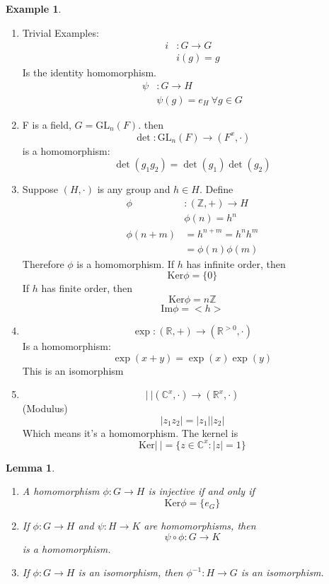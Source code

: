 \documentclass{report}
\newtheorem{lemma}[theorem]{Lemma}
\theoremstyle{remark}
\theoremstyle{definition}
\theoremstyle{definition}
\newtheorem{example}[theorem]{Example}
\theoremstyle{theorem}
\begin{document}
\begin{example}
\begin{enumerate}[label=\textcircled{\tiny{\arabic*}}]
    \setcounter{enumi}{0}
    \item Trivial Examples:
    \begin{align*}
        i&: G \rightarrow G\\
        &i(g)=g 
    \end{align*}
    Is the identity homomorphism.
    \begin{align*}
        \psi&:G \rightarrow H\\
        &\psi(g)=e_H \> \forall g \in G
    \end{align*}
    \item F is a field, $G=\mathrm{GL}_n(F)$. then
    \[\det: \mathrm{GL}_n(F) \rightarrow (F^x, \cdot)\]
    is a homomorphism:
    \[\det(g_1g_2)=\det(g_1)\det(g_2)\]
    \item Suppose $(H, \cdot)$ is any group and $h \in H$. Define
    \begin{align*}
        \phi&: (\mathbb{Z}, +) \rightarrow H\\
        &\phi(n)=h^n\\
        \phi(n+m)&=h^{n+m}=h^nh^m\\
        &=\phi(n)\phi(m)
    \end{align*}
    Therefore $\phi$ is a homomorphism. If $h$ has infinite order, then
    \[\mathrm{Ker}\phi=\{0\}\]
    If $h$ has finite order, then
    \[\mathrm{Ker}\phi=n\mathbb{Z}\]
    \[\mathrm{Im}\phi=<h>\]
    \item
    \[\exp: (\mathbb{R}, +) \rightarrow (\mathbb{R}^{>0}, \cdot)\]
    Is a homomorphism:
    \[\exp(x+y)=\exp(x)\exp(y)\]
    This is an isomorphism
    \item \[|\>|(\mathbb{C}^x,\cdot) \rightarrow (\mathbb{R}^x,\cdot)\]
    (Modulus)
    \[|z_1z_2|=|z_1||z_2|\]
    Which means it's a homomorphism. The kernel is
    \[\mathrm{Ker}|\>|=\{z \in \mathbb{C}^x: |z|=1\}\]
\end{enumerate}
\end{example}
\begin{lemma}
\begin{enumerate}[label=\roman*)]
    \item A homomorphism $\phi:G\rightarrow H$ is injective if and only if
    \[\mathrm{Ker}\phi=\{e_G\}\]
    \item If $\phi: G \rightarrow H$ and $\psi: H \rightarrow K$ are homomorphisms, then
    \[\psi \circ \phi: G \rightarrow K\]
    is a homomorphism.
    \item If $\phi:G \rightarrow H$ is an isomorphism, then $\phi^{-1}:H \rightarrow G$ is an isomorphism.
\end{enumerate}
\end{lemma}
\end{document}
